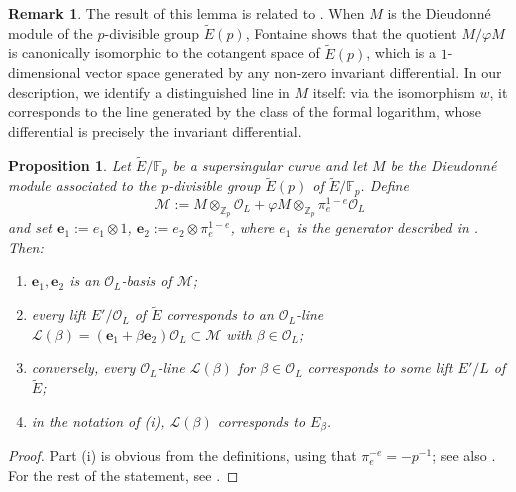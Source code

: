 \documentclass{amsart}
\newtheorem{proposition}[theorem]{Proposition}
\theoremstyle{definition}
\newtheorem{remark}[theorem]{Remark}
\newcommand{\Z}{\mathbb{Z}}
\numberwithin{theorem}{section}
\numberwithin{equation}{section}
\begin{document}
\begin{remark}
    The result of this lemma is related to \cite[Chapitre III, Proposition 4.3]{Fontaine-p-divisible}. When $M$ is the Dieudonn\'{e} module of the $p$-divisible group $\tilde{E}(p)$, Fontaine shows that the quotient $M/\varphi M$ is canonically isomorphic to the cotangent space of $\tilde{E}(p)$, which is a $1$-dimensional vector space generated by any non-zero invariant differential. In our description, we identify a distinguished line in $M$ itself: via the isomorphism $w$, it corresponds to the line generated by the class of the formal logarithm, whose differential is precisely the invariant differential.
\end{remark}

\begin{proposition}\label{prop: Dieudonne mod}
Let $\tilde{E}/\mathbb{F}_p$ be a supersingular curve and let $M$ be the Dieudonn\'{e} module associated to the $p$-divisible group $\tilde{E}(p)$ of $\tilde{E}/\mathbb{F}_p$. Define
\[
\mathcal{M} := M \otimes_{\Z_p} \mathcal{O}_L + \varphi M \otimes_{\Z_p} \pi_e^{1-e}\mathcal{O}_L
\]
and set $\mathbf e_1:=e_1\otimes 1$, $\mathbf e_2:=e_2\otimes \pi_e^{1-e}$, where $e_1$ is the generator described in .
Then:
\begin{enumerate}
\item $\mathbf{e}_1, \mathbf{e}_2$ is an $\mathcal{O}_L$-basis of $\mathcal{M}$;
\item every lift  $E'/\mathcal{O}_L$ of $\tilde{E}$ corresponds to an $\mathcal{O}_L$-line $\mathcal{L}(\beta) = (\mathbf{e}_1 + \beta\mathbf{e}_2)\mathcal{O}_L \subset \mathcal{M}$  with $\beta \in \mathcal{O}_L$;
\item conversely, every $\mathcal{O}_L$-line $\mathcal{L}(\beta)$ for $\beta \in \mathcal{O}_L$ corresponds to some lift $E'/L$ of $\tilde{E}$;
\item in the notation of (i), $\mathcal{L}(\beta)$ corresponds to $E_\beta$.
\end{enumerate}
\end{proposition}

\begin{proof}
Part (i) is obvious from the definitions, using that $\pi_e^{-e}=-p^{-1}$; see also \cite[beginning of \S2.2]{Kawachi}. For the rest of the statement, see \cite[\S3.3.1.2 and Proposition 4, p.~83]{Volkov}.
\end{proof}
\end{document}

